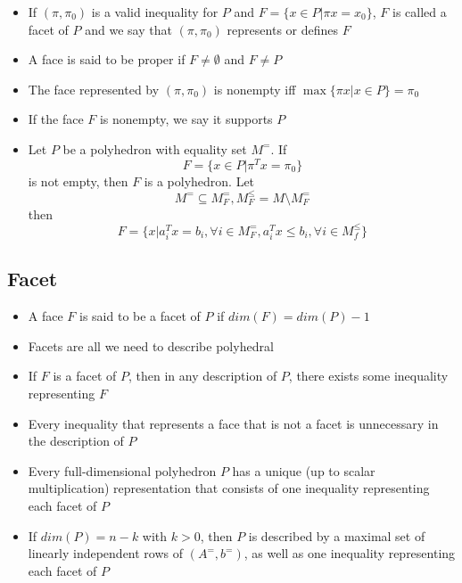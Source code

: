             \begin{itemize}
                \item If $(\pi, \pi_0)$ is a valid inequality for $P$ and $F=\{x\in P|\pi x=x_0\}$, $F$ is called a facet of $P$ and we say that $(\pi, \pi_0)$ represents or defines $F$
                \item A face is said to be proper if $F\ne \emptyset$ and $F\ne P$
                \item The face represented by $(\pi, \pi_0)$ is nonempty iff $\max \{\pi x |x\in P\}=\pi_0$
                \item If the face $F$ is nonempty, we say it supports $P$
                \item Let $P$ be a polyhedron with equality set $M^=$. If
                    \begin{equation*}
                        F=\{x\in P | \pi^T x = \pi_0\}
                    \end{equation*}
                    is not empty, then $F$ is a polyhedron. Let 
                    \begin{equation*}
                        M^= \subseteq M_F^=, M_F^{\le}=M \setminus M_F^= 
                    \end{equation*}
                    then 
                    \begin{equation*}
                        F=\{x | a_i^T x=b_i, \forall i \in M_F^=, a_i^T x \le b_i, \forall i \in M_f^{\le}\}
                    \end{equation*}
            \end{itemize}

        \subsection{Facet}
            \begin{itemize}
                \item A face $F$ is said to be a facet of $P$ if $dim(F) = dim(P)-1$
                \item Facets are all we need to describe polyhedral
                \item If $F$ is a facet of $P$, then in any description of $P$, there exists some inequality representing $F$
                \item Every inequality that represents a face that is not a facet is unnecessary in the description of $P$
                \item Every full-dimensional polyhedron $P$ has a unique (up to scalar multiplication) representation that consists of one inequality representing each facet of $P$
                \item If $dim(P) = n-k$ with $k>0$, then $P$ is described by a maximal set of linearly independent rows of $(A^=, b^=)$, as well as one inequality representing each facet of $P$
            \end{itemize}
            
